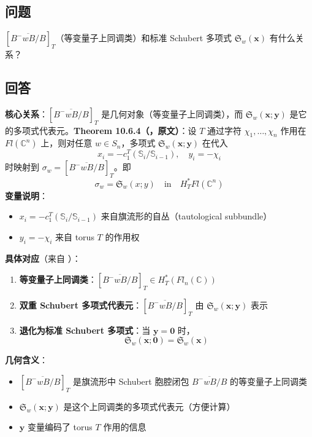 \subsection{问题}
$[\overline{B^-wB/B}]_T$（等变量子上同调类）和标准 Schubert 多项式 $\mathfrak{S}_w(\mathbf{x})$ 有什么关系？
\subsection{回答}
\textbf{核心关系}：$[\overline{B^-wB/B}]_T$ 是几何对象（等变量子上同调类），而 $\mathfrak{S}_w(\mathbf{x};\mathbf{y})$ 是它的多项式代表元。\textbf{Theorem 10.6.4（\cite[ Theorem 10.6.4]{anderson2023}，原文）}：设 $T$ 通过字符 $\chi_1, \ldots, \chi_n$ 作用在 $Fl(\mathbb{C}^n)$ 上，则对任意 $w \in S_n$，多项式 $\mathfrak{S}_w(\mathbf{x}; \mathbf{y})$ 在代入$$x_i = -c_1^T(\mathbb{S}_i / \mathbb{S}_{i-1}), \quad y_i = -\chi_i$$时映射到 $\sigma_w = [\overline{B^-wB/B}]_T$。即$$\sigma_w = \mathfrak{S}_w(x; y) \quad \text{in} \quad H_T^* Fl(\mathbb{C}^n)$$\textbf{变量说明}：
\begin{itemize}
\item $x_i = -c_1^T(\mathbb{S}_i / \mathbb{S}_{i-1})$ 来自旗流形的自丛（tautological subbundle）\item $y_i = -\chi_i$ 来自 torus $T$ 的作用权
\end{itemize}

\textbf{具体对应}（来自 \cite[ Theorem 10.6.4]{anderson2023}）：
\begin{enumerate}
\item \textbf{等变量子上同调类}：$[\overline{B^-wB/B}]_T \in H_T^*(Fl_n(\mathbb{C}))$\item \textbf{双重 Schubert 多项式代表元}：$[\overline{B^-wB/B}]_T$ 由 $\mathfrak{S}_w(\mathbf{x}; \mathbf{y})$ 表示\item \textbf{退化为标准 Schubert 多项式}：当 $\mathbf{y} = \mathbf{0}$ 时，$$\mathfrak{S}_w(\mathbf{x}; \mathbf{0}) = \mathfrak{S}_w(\mathbf{x})$$
\end{enumerate}

\textbf{几何含义}：
\begin{itemize}
\item $[\overline{B^-wB/B}]_T$ 是旗流形中 Schubert 胞腔闭包 $\overline{B^-wB/B}$ 的等变量子上同调类\item $\mathfrak{S}_w(\mathbf{x}; \mathbf{y})$ 是这个上同调类的多项式代表元（方便计算）\item $\mathbf{y}$ 变量编码了 torus $T$ 作用的信息
\end{itemize}

